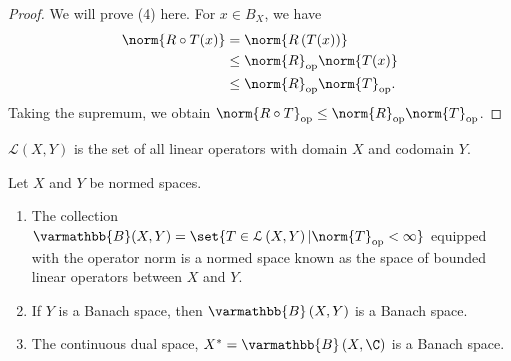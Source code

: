 \documentclass[10pt]{mypackage}
\renewcommand*{\mathbb}[1]{\varmathbb{#1}}
\newcommand{\B}{\mathbb{B}}
\begin{document}
\begin{proof}
  We will prove (4) here. For $x\in B_{X}$, we have
  \begin{align*}
    \norm{R\circ T(x)} &= \norm{R\left(T(x)\right)}\\
                       &\leq \norm{R}_{\text{op}}\norm{T(x)}\\
                       &\leq \norm{R}_{\text{op}}\norm{T}_{\text{op}}.
  \end{align*}
  Taking the supremum, we obtain $\norm{R\circ T}_{\text{op}}\leq \norm{R}_{\text{op}}\norm{T}_{\text{op}}$.
\end{proof}
\begin{recall}
  $\mathcal{L}(X,Y)$ is the set of all linear operators with domain $X$ and codomain $Y$.
\end{recall}
\begin{proposition}
  Let $X$ and $Y$ be normed spaces.
  \begin{enumerate}[(1)]
    \item The collection $\B(X,Y) = \set{T\in \mathcal{L}\left(X,Y\right)| \norm{T}_{\text{op}} < \infty}$ equipped with the operator norm is a normed space known as the space of bounded linear operators between $X$ and $Y$.
    \item If $Y$ is a Banach space, then $\B\left(X,Y\right)$ is a Banach space.
    \item The continuous dual space, $X^{\ast} = \B\left(X,\C\right)$ is a Banach space.
  \end{enumerate}
\end{proposition}
\end{document}
